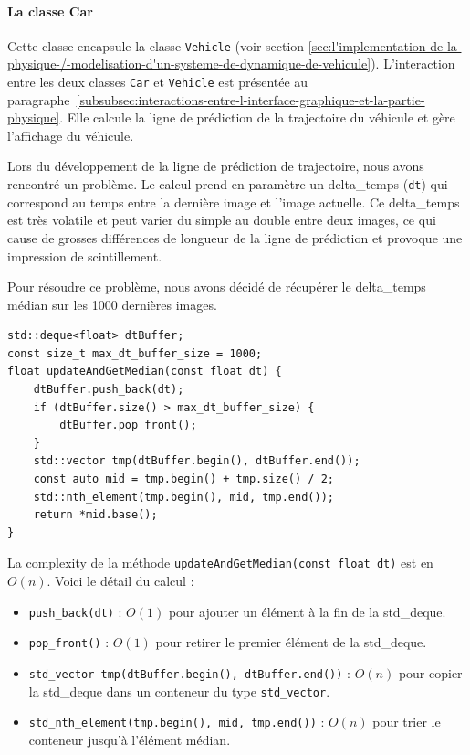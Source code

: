 \paragraph[Car]{La classe \textbf{Car}}
Cette classe encapsule la classe \texttt{Vehicle} (voir section \ref{sec:l'implementation-de-la-physique-/-modelisation-d'un-systeme-de-dynamique-de-vehicule}).
L'interaction entre les deux classes \texttt{Car} et \texttt{Vehicle} est présentée au paragraphe~\ref{subsubsec:interactions-entre-l-interface-graphique-et-la-partie-physique}.
Elle calcule la ligne de prédiction de la trajectoire du véhicule et gère l'affichage du véhicule.

Lors du développement de la ligne de prédiction de trajectoire, nous avons rencontré un problème.
Le calcul prend en paramètre un \gls{delta_temps} (\texttt{dt}) qui correspond au temps entre la dernière image et l'image actuelle.
Ce \gls{delta_temps} est très volatile et peut varier du simple au double entre deux images, ce qui cause de grosses différences de longueur de la ligne de prédiction et provoque une impression de scintillement.

Pour résoudre ce problème, nous avons décidé de récupérer le \gls{delta_temps} médian sur les 1000 dernières images.

\begin{lstlisting}[style=CStyle, label={lst:code_dequeue_dt}]
std::deque<float> dtBuffer;
const size_t max_dt_buffer_size = 1000;
float updateAndGetMedian(const float dt) {
    dtBuffer.push_back(dt);
    if (dtBuffer.size() > max_dt_buffer_size) {
        dtBuffer.pop_front();
    }
    std::vector tmp(dtBuffer.begin(), dtBuffer.end());
    const auto mid = tmp.begin() + tmp.size() / 2;
    std::nth_element(tmp.begin(), mid, tmp.end());
    return *mid.base();
}
\end{lstlisting}

La \gls{complexity} de la méthode \texttt{updateAndGetMedian(const float dt)} est en \( O(n) \).
Voici le détail du calcul :
\begin{itemize}
    \item \texttt{push\_back(dt)} : \( O(1) \)\cite{cpp_reference_push_back} pour ajouter un élément à la fin de la \gls{std_deque}.
    \item \texttt{pop\_front()} : \( O(1) \)\cite{cpp_reference_pop_front} pour retirer le premier élément de la \gls{std_deque}.
    \item \texttt{\gls{std_vector} tmp(dtBuffer.begin(), dtBuffer.end())} : \( O(n) \)\cite{cpp_reference_vector} pour copier la \gls{std_deque} dans un conteneur du type \texttt{\gls{std_vector}}.
    \item \texttt{\gls{std_nth_element}(tmp.begin(), mid, tmp.end())} : \( O(n) \)\cite{cpp_reference_std_nth_element} pour trier le conteneur jusqu'à l'élément médian.
\end{itemize}

